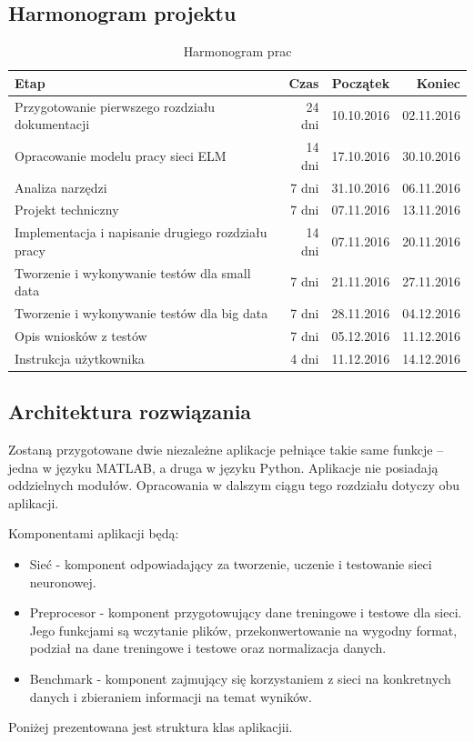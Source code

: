 \documentclass{article}
\begin{document}
\subsection{Harmonogram projektu}
\begin{table}[H]
\caption{Harmonogram prac}
\begin{tabular}{|l|r|r|r|}
\hline
\textbf{Etap} & \textbf{Czas} & \textbf{Początek} & \textbf{Koniec} \\
\hline
Przygotowanie pierwszego rozdziału dokumentacji & 24 dni & 10.10.2016 & 02.11.2016 \\
Opracowanie modelu pracy sieci ELM & 14 dni & 17.10.2016 & 30.10.2016 \\
Analiza narzędzi & 7 dni & 31.10.2016 & 06.11.2016 \\
Projekt techniczny & 7 dni & 07.11.2016 & 13.11.2016 \\
Implementacja i napisanie drugiego rozdziału pracy & 14 dni & 07.11.2016 & 20.11.2016 \\
Tworzenie i wykonywanie testów dla small data & 7 dni & 21.11.2016 & 27.11.2016 \\
Tworzenie i wykonywanie testów dla big data & 7 dni & 28.11.2016 & 04.12.2016 \\
Opis wniosków z testów & 7 dni & 05.12.2016 & 11.12.2016 \\
Instrukcja użytkownika & 4 dni & 11.12.2016 & 14.12.2016 \\
\hline
\end{tabular}
\end{table}
\subsection{Architektura rozwiązania}
Zostaną przygotowane dwie niezależne aplikacje pełniące takie same funkcje -- jedna w języku MATLAB, a druga w języku Python. Aplikacje nie posiadają oddzielnych modułów. Opracowania w dalszym ciągu tego rozdziału dotyczy obu aplikacji.

Komponentami aplikacji będą:
\begin{itemize}
\item Sieć - komponent odpowiadający za tworzenie, uczenie i testowanie sieci neuronowej.
\item Preprocesor - komponent przygotowujący dane treningowe i testowe dla sieci. Jego funkcjami są wczytanie plików, przekonwertowanie na wygodny format, podział na dane treningowe i testowe oraz normalizacja danych.
\item Benchmark - komponent zajmujący się korzystaniem z sieci na konkretnych danych i zbieraniem informacji na temat wyników.
\end{itemize}
Poniżej prezentowana jest struktura klas aplikacjii.
\end{document}
